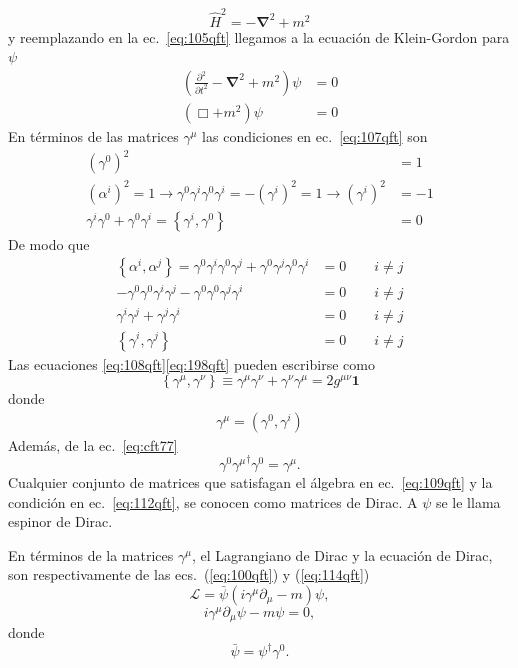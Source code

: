 \begin{equation}
  \hat{H}^2=-\boldsymbol{\nabla}^2+m^2
\end{equation}
y reemplazando en la ec.~\eqref{eq:105qft} llegamos a la ecuación de Klein-Gordon para $\psi$
\begin{align}
   \left(\frac{\partial^2}{\partial t^2}-\boldsymbol{\nabla}^2+m^2\right)\psi&=0\nonumber\\
   \left(\Box+m^2\right)\psi&=0
\end{align}
En términos de las matrices $\gamma^\mu$ las condiciones en ec.~\eqref{eq:107qft} son
\begin{align}
  \label{eq:108qft}
  \left({\gamma^0}\right)^2&=1\nonumber\\
  \left({\alpha^i}\right)^2=1\to\gamma^0\gamma^i \gamma^0\gamma^i=-\left({\gamma^i}\right)^2=1\to\left({\gamma^i}\right)^2&=-1\nonumber\\
  \gamma^i \gamma^0+\gamma^0\gamma^i=\left\{\gamma^i,\gamma^0\right\}&=0
\end{align}
De modo que
\begin{align}
  \label{eq:198qft}
\left\{\alpha^i,\alpha^j\right\}=\gamma^0\gamma^i \gamma^0\gamma^j+\gamma^0\gamma^j \gamma^0\gamma^i&=0\qquad i\neq j\nonumber\\
-\gamma^0\gamma^0\gamma^i \gamma^j-\gamma^0\gamma^0\gamma^j \gamma^i&=0\qquad i\neq j\nonumber\\
\gamma^i \gamma^j+\gamma^j \gamma^i&=0\qquad i\neq j\nonumber\\
\left\{\gamma^i,\gamma^j\right\}&=0\qquad i\neq j
\end{align}
Las ecuaciones \eqref{eq:108qft}\eqref{eq:198qft} pueden escribirse como
\begin{equation}
  \label{eq:109qft}
  \left\{\gamma^\mu,\gamma^\nu\right\}\equiv\gamma^\mu\gamma^\nu+\gamma^\nu\gamma^\mu=2g^{\mu\nu}\mathbf{1}
\end{equation}
donde
\begin{align}
  \gamma^\mu=(\gamma^0,\gamma^i)
\end{align}
Además, de la ec.~\eqref{eq:cft77}
\begin{equation}
  \label{eq:112qft}
   \gamma^0{\gamma^\mu}^\dagger \gamma^0=\gamma^\mu.
\end{equation}
Cualquier conjunto de matrices que satisfagan el álgebra en ec.~\eqref{eq:109qft} y la condición en ec.~\eqref{eq:112qft}, se conocen como matrices de Dirac. A $\psi$ se le llama espinor de Dirac.

En términos de la matrices $\gamma^\mu$, el Lagrangiano de Dirac y la ecuación de Dirac, son respectivamente de las ecs.~(\ref{eq:100qft}) y (\ref{eq:114qft})
\begin{equation}
  \label{eq:115qft}
  \mathcal{L}=\bar{\psi}\left(i\gamma^\mu\partial_\mu-m\right)\psi,
\end{equation}
\begin{equation}
  \label{eq:116qft}
  i\gamma^\mu\partial_\mu\psi-m\psi=0,
\end{equation}
donde
\begin{equation}
  \bar{\psi}=\psi^\dagger\gamma^0.
\end{equation}





